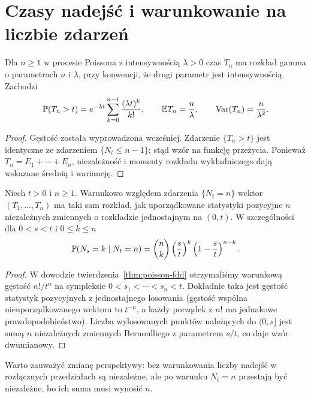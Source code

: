 \section{Czasy nadejść i warunkowanie na liczbie zdarzeń}
\begin{twierdzenie}
Dla $n\ge1$ w procesie Poissona z intensywnością $\lambda>0$
czas $T_n$ ma rozkład gamma o parametrach $n$ i $\lambda$,
przy konwencji, że drugi parametr jest intensywnością. Zachodzi
\[
\mathbb{P}(T_n>t)=e^{-\lambda t}\sum_{k=0}^{n-1}
\frac{(\lambda t)^k}{k!},\qquad
\mathbb{E} T_n=\frac n\lambda,\qquad \operatorname{Var}(T_n)=\frac n{\lambda^2}.
\]
\end{twierdzenie}
\begin{proof}
Gęstość została wyprowadzona wcześniej. Zdarzenie
$\{T_n>t\}$ jest identyczne ze zdarzeniem $\{N_t\le n-1\}$;
stąd wzór na funkcję przeżycia. Ponieważ
$T_n=E_1+\cdots+E_n$, niezależność i momenty rozkładu
wykładniczego dają wskazane średnią i wariancję.
\end{proof}

\begin{twierdzenie}
\label{thm:uniform-poisson-times}
Niech $t>0$ i $n\ge1$. Warunkowo względem zdarzenia
$\{N_t=n\}$ wektor $(T_1,\ldots,T_n)$ ma taki sam rozkład,
jak uporządkowane statystyki pozycyjne $n$ niezależnych
zmiennych o rozkładzie jednostajnym na $(0,t)$.
W szczególności dla $0<s<t$ i $0\le k\le n$
\[
\mathbb{P}(N_s=k\mid N_t=n)
=\binom nk\left(\frac{s}{t}\right)^k
\left(1-\frac{s}{t}\right)^{n-k}.
\]
\end{twierdzenie}
\begin{proof}
W dowodzie twierdzenia~\ref{thm:poisson-fdd} otrzymaliśmy
warunkową gęstość $n!/t^n$ na sympleksie
$0<s_1<\cdots<s_n<t$. Dokładnie taka jest gęstość
statystyk pozycyjnych z jednostajnego losowania
(gęstość wspólna nieuporządkowanego wektora to $t^{-n}$,
a każdy porządek z $n!$ ma jednakowe prawdopodobieństwo).
Liczba wylosowanych punktów należących do $(0,s]$ jest sumą
$n$ niezależnych zmiennych Bernoulliego z parametrem $s/t$,
co daje wzór dwumianowy.
\end{proof}

Warto zauważyć zmianę perspektywy: bez warunkowania liczby
nadejść w rozłącznych przedziałach są niezależne, ale po warunku
$N_t=n$ przestają być niezależne, bo ich suma musi wynosić $n$.

